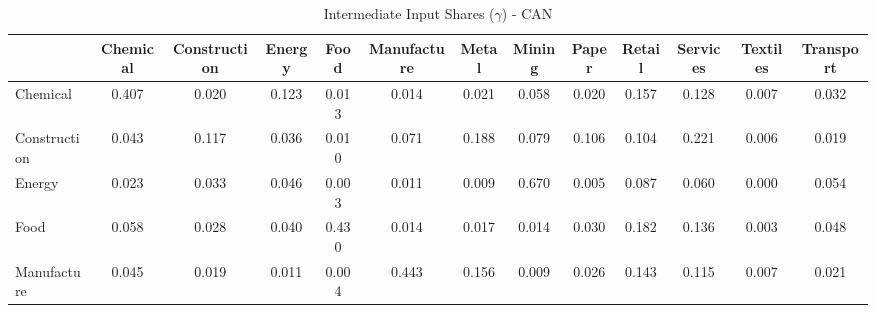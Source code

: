 \begin{table}[htbp]
\centering
\caption{Intermediate Input Shares ($\gamma$) - CAN} 
\label{tab:gamma_CAN}
\begin{tabular}{lcccccccccccc}
  \hline
 & Chemical & Construction & Energy & Food & Manufacture & Metal & Mining & Paper & Retail & Services & Textiles & Transport \\ 
  \hline
Chemical & \textcolor[RGB]{12,8,243}{0.407} & \textcolor[RGB]{168,109,87}{0.020} & \textcolor[RGB]{55,36,200}{0.123} & \textcolor[RGB]{195,126,60}{0.013} & \textcolor[RGB]{188,121,67}{0.014} & \textcolor[RGB]{163,105,92}{0.021} & \textcolor[RGB]{92,60,163}{0.058} & \textcolor[RGB]{166,108,89}{0.020} & \textcolor[RGB]{37,24,218}{0.157} & \textcolor[RGB]{53,34,202}{0.128} & \textcolor[RGB]{221,143,34}{0.007} & \textcolor[RGB]{131,85,124}{0.032} \\ 
  Construction & \textcolor[RGB]{113,73,142}{0.043} & \textcolor[RGB]{58,38,197}{0.117} & \textcolor[RGB]{122,79,133}{0.036} & \textcolor[RGB]{204,132,51}{0.010} & \textcolor[RGB]{83,54,172}{0.071} & \textcolor[RGB]{28,18,227}{0.188} & \textcolor[RGB]{74,48,181}{0.079} & \textcolor[RGB]{62,40,193}{0.106} & \textcolor[RGB]{64,41,191}{0.104} & \textcolor[RGB]{21,14,234}{0.221} & \textcolor[RGB]{223,144,32}{0.006} & \textcolor[RGB]{174,112,81}{0.019} \\ 
  Energy & \textcolor[RGB]{152,99,103}{0.023} & \textcolor[RGB]{128,82,128}{0.033} & \textcolor[RGB]{110,71,145}{0.046} & \textcolor[RGB]{241,156,14}{0.003} & \textcolor[RGB]{202,131,53}{0.011} & \textcolor[RGB]{209,135,46}{0.009} & \textcolor[RGB]{0,0,255}{0.670} & \textcolor[RGB]{228,148,27}{0.005} & \textcolor[RGB]{71,46,184}{0.087} & \textcolor[RGB]{90,58,165}{0.060} & \textcolor[RGB]{253,164,2}{0.000} & \textcolor[RGB]{96,62,159}{0.054} \\ 
  Food & \textcolor[RGB]{94,61,161}{0.058} & \textcolor[RGB]{142,92,113}{0.028} & \textcolor[RGB]{115,74,140}{0.040} & \textcolor[RGB]{11,7,244}{0.430} & \textcolor[RGB]{189,123,66}{0.014} & \textcolor[RGB]{181,117,74}{0.017} & \textcolor[RGB]{191,124,64}{0.014} & \textcolor[RGB]{136,88,119}{0.030} & \textcolor[RGB]{30,19,225}{0.182} & \textcolor[RGB]{50,32,205}{0.136} & \textcolor[RGB]{244,158,11}{0.003} & \textcolor[RGB]{104,68,151}{0.048} \\ 
  Manufacture & \textcolor[RGB]{112,72,143}{0.045} & \textcolor[RGB]{172,111,83}{0.019} & \textcolor[RGB]{200,129,55}{0.011} & \textcolor[RGB]{237,154,18}{0.004} & \textcolor[RGB]{9,6,246}{0.443} & \textcolor[RGB]{39,25,216}{0.156} & \textcolor[RGB]{211,136,44}{0.009} & \textcolor[RGB]{149,96,106}{0.026} & \textcolor[RGB]{44,29,211}{0.143} & \textcolor[RGB]{60,39,195}{0.115} & \textcolor[RGB]{220,142,35}{0.007} & \textcolor[RGB]{165,107,90}{0.021} \\ 

\end{tabular}
\end{table}
